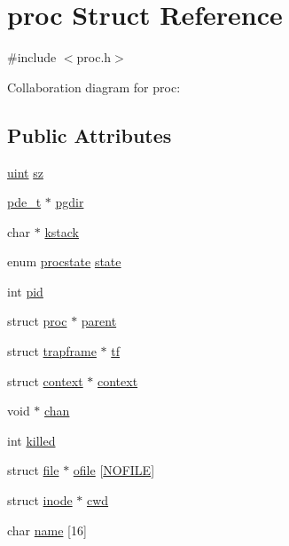 \hypertarget{structproc}{}\section{proc Struct Reference}
\label{structproc}


{\ttfamily \#include $<$proc.\+h$>$}



Collaboration diagram for proc\+:
\subsection*{Public Attributes}
\begin{DoxyCompactItemize}
\item 
\hyperlink{custom__types_8h_a91ad9478d81a7aaf2593e8d9c3d06a14}{uint} \hyperlink{structproc_a6e67042bb361124ff287af88efc33e00}{sz}
\item 
\hyperlink{custom__types_8h_ac131849542282b2c95dfeaf1f26dc010}{pde\+\_\+t} $\ast$ \hyperlink{structproc_ad430afc653e9eb6cee33954d5545b79d}{pgdir}
\item 
char $\ast$ \hyperlink{structproc_a9f556df98482bff6c9216013d7581ae4}{kstack}
\item 
enum \hyperlink{proc_8h_aa1ced7d2b60040fded3fa873d0c03ba7}{procstate} \hyperlink{structproc_a0f2fe91548a1382672ae26e29ca9e736}{state}
\item 
int \hyperlink{structproc_acf2bdf54d1f957ccbcdc987007029944}{pid}
\item 
struct \hyperlink{structproc}{proc} $\ast$ \hyperlink{structproc_a14ea8849701ffafba4d142725de154d4}{parent}
\item 
struct \hyperlink{structtrapframe}{trapframe} $\ast$ \hyperlink{structproc_a56ec07ac1e10ce42adfc8dd2a366071f}{tf}
\item 
struct \hyperlink{structcontext}{context} $\ast$ \hyperlink{structproc_ae0d9bffe1ad1c7d60dd2733be0a2333c}{context}
\item 
void $\ast$ \hyperlink{structproc_a03048a49756c2243576208ba4ec5fbd4}{chan}
\item 
int \hyperlink{structproc_afb4f94a3f4df9a835dbb41b0c26660a4}{killed}
\item 
struct \hyperlink{structfile}{file} $\ast$ \hyperlink{structproc_a4a9eb0352efe3fc097c91fccfaac50bd}{ofile} \mbox{[}\hyperlink{param_8h_a80bacbaea8dd6aecf216d85d981bcb21}{N\+O\+F\+I\+LE}\mbox{]}
\item 
struct \hyperlink{structinode}{inode} $\ast$ \hyperlink{structproc_a493bc338ce008a838eef521972a35257}{cwd}
\item 
char \hyperlink{structproc_ac04af53e17d24b90c3cbfab56d658d62}{name} \mbox{[}16\mbox{]}
\end{DoxyCompactItemize}


